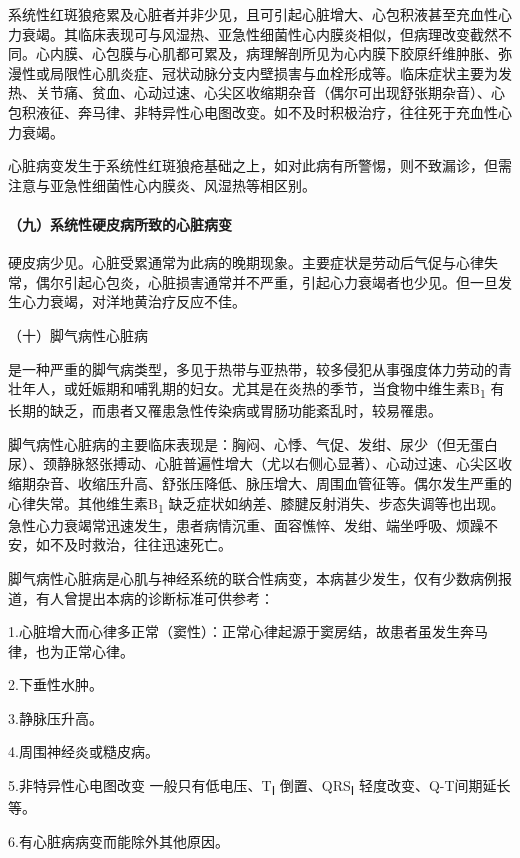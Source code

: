 系统性红斑狼疮累及心脏者并非少见，且可引起心脏增大、心包积液甚至充血性心力衰竭。其临床表现可与风湿热、亚急性细菌性心内膜炎相似，但病理改变截然不同。心内膜、心包膜与心肌都可累及，病理解剖所见为心内膜下胶原纤维肿胀、弥漫性或局限性心肌炎症、冠状动脉分支内壁损害与血栓形成等。临床症状主要为发热、关节痛、贫血、心动过速、心尖区收缩期杂音（偶尔可出现舒张期杂音）、心包积液征、奔马律、非特异性心电图改变。如不及时积极治疗，往往死于充血性心力衰竭。

心脏病变发生于系统性红斑狼疮基础之上，如对此病有所警惕，则不致漏诊，但需注意与亚急性细菌性心内膜炎、风湿热等相区别。

\paragraph{（九）系统性硬皮病所致的心脏病变}

硬皮病少见。心脏受累通常为此病的晚期现象。主要症状是劳动后气促与心律失常，偶尔引起心包炎，心脏损害通常并不严重，引起心力衰竭者也少见。但一旦发生心力衰竭，对洋地黄治疗反应不佳。

\hypertarget{text00139.htmlux5cux23CHP16-3-3-2-10}{}
（十）脚气病性心脏病

是一种严重的脚气病类型，多见于热带与亚热带，较多侵犯从事强度体力劳动的青壮年人，或妊娠期和哺乳期的妇女。尤其是在炎热的季节，当食物中维生素B\textsubscript{1}
有长期的缺乏，而患者又罹患急性传染病或胃肠功能紊乱时，较易罹患。

脚气病性心脏病的主要临床表现是：胸闷、心悸、气促、发绀、尿少（但无蛋白尿）、颈静脉怒张搏动、心脏普遍性增大（尤以右侧心显著）、心动过速、心尖区收缩期杂音、收缩压升高、舒张压降低、脉压增大、周围血管征等。偶尔发生严重的心律失常。其他维生素B\textsubscript{1}
缺乏症状如纳差、膝腱反射消失、步态失调等也出现。急性心力衰竭常迅速发生，患者病情沉重、面容憔悴、发绀、端坐呼吸、烦躁不安，如不及时救治，往往迅速死亡。

脚气病性心脏病是心肌与神经系统的联合性病变，本病甚少发生，仅有少数病例报道，有人曾提出本病的诊断标准可供参考：

1.心脏增大而心律多正常（窦性）：正常心律起源于窦房结，故患者虽发生奔马律，也为正常心律。

2.下垂性水肿。

3.静脉压升高。

4.周围神经炎或糙皮病。

5.非特异性心电图改变 一般只有低电压、T\textsubscript{Ⅰ}
倒置、QRS\textsubscript{Ⅰ} 轻度改变、Q-T间期延长等。

6.有心脏病病变而能除外其他原因。

